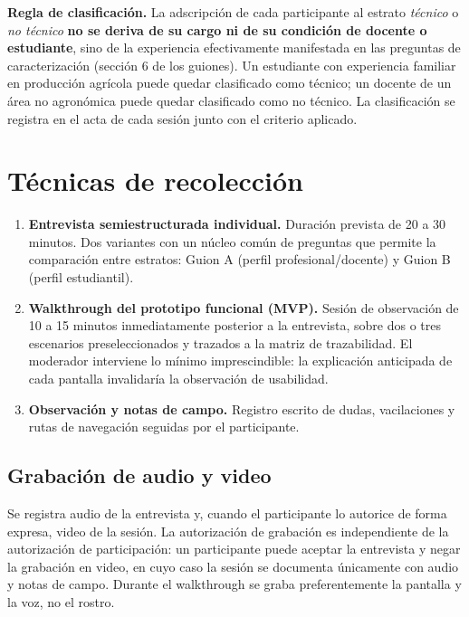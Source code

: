 \documentclass[11pt,a4paper]{article}
\begin{document}
\begin{tcolorbox}[colback=grisclaro,colframe=black!35,boxrule=0.6pt,arc=2pt,left=6pt,right=6pt,top=4pt,bottom=4pt]
\textbf{Regla de clasificación.} La adscripción de cada participante al estrato \emph{técnico} o
\emph{no técnico} \textbf{no se deriva de su cargo ni de su condición de docente o estudiante}, sino de la
experiencia efectivamente manifestada en las preguntas de caracterización (sección 6 de los guiones). Un
estudiante con experiencia familiar en producción agrícola puede quedar clasificado como técnico; un
docente de un área no agronómica puede quedar clasificado como no técnico. La clasificación se registra en
el acta de cada sesión junto con el criterio aplicado.
\end{tcolorbox}

\section{Técnicas de recolección}

\begin{enumerate}[leftmargin=*,itemsep=3pt]
  \item \textbf{Entrevista semiestructurada individual.} Duración prevista de 20 a 30 minutos. Dos
        variantes con un núcleo común de preguntas que permite la comparación entre estratos: Guion A
        (perfil profesional/docente) y Guion B (perfil estudiantil).
  \item \textbf{Walkthrough del prototipo funcional (MVP).} Sesión de observación de 10 a 15 minutos
        inmediatamente posterior a la entrevista, sobre dos o tres escenarios preseleccionados y trazados
        a la matriz de trazabilidad. El moderador interviene lo mínimo imprescindible: la explicación
        anticipada de cada pantalla invalidaría la observación de usabilidad.
  \item \textbf{Observación y notas de campo.} Registro escrito de dudas, vacilaciones y rutas de
        navegación seguidas por el participante.
\end{enumerate}

\subsection{Grabación de audio y video}

Se registra audio de la entrevista y, cuando el participante lo autorice de forma expresa, video de la
sesión. La autorización de grabación es independiente de la autorización de participación: un participante
puede aceptar la entrevista y negar la grabación en video, en cuyo caso la sesión se documenta únicamente
con audio y notas de campo. Durante el walkthrough se graba preferentemente la pantalla y la voz, no el
rostro.
\end{document}
